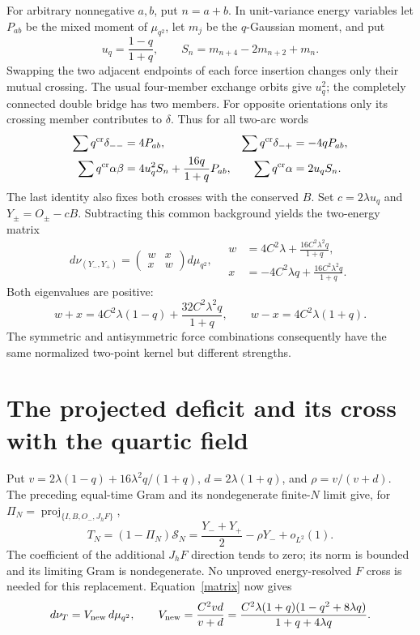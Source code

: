 \documentclass[11pt,a4paper]{article}
\begin{document}
For arbitrary nonnegative $a,b$, put $n=a+b$. In unit-variance
energy variables let $P_{ab}$ be the mixed moment of $\mu_{q^2}$,
let $m_j$ be the $q$-Gaussian moment, and put
\begin{equation}
 u_q=\frac{1-q}{1+q},\qquad S_n=m_{n+4}-2m_{n+2}+m_n.
\end{equation}
Swapping the two adjacent endpoints of each force insertion changes
only their mutual crossing. The usual four-member exchange orbits
give $u_q^2$; the completely connected double bridge has two
members. For opposite orientations only its crossing member
contributes to $\delta$. Thus for all two-arc words
\begin{align}
 \sum q^{\rm cr}\delta_{--}&=4P_{ab},&
 \sum q^{\rm cr}\delta_{-+}&=-4qP_{ab},\\
 \sum q^{\rm cr}\alpha\beta&=4u_q^2S_n+
                  \frac{16q}{1+q}P_{ab},&
 \sum q^{\rm cr}\alpha&=2u_qS_n.
\end{align}
The last identity also fixes both crosses with the conserved $B$.
Set $c=2\lambda u_q$ and $Y_\pm=O_\pm-cB$. Subtracting this common
background yields the two-energy matrix
\begin{equation}
 d\nu_{(Y_-,Y_+)}=
 \begin{pmatrix}w&x\\x&w\end{pmatrix}d\mu_{q^2},\quad
 \begin{aligned}
 w&=4C^2\lambda+\frac{16C^2\lambda^2q}{1+q},\\
 x&=-4C^2\lambda q+\frac{16C^2\lambda^2q}{1+q}.
 \end{aligned} \label{matrix}
\end{equation}
Both eigenvalues are positive:
\begin{equation}
 w+x=4C^2\lambda(1-q)+\frac{32C^2\lambda^2q}{1+q},\qquad
 w-x=4C^2\lambda(1+q).
\end{equation}
The symmetric and antisymmetric force combinations consequently
have the same normalized two-point kernel but different strengths.

\newpage
\section{The projected deficit and its cross with the quartic field}
Put $v=2\lambda(1-q)+16\lambda^2q/(1+q)$, $d=2\lambda(1+q)$,
and $\rho=v/(v+d)$. The preceding equal-time Gram and its
nondegenerate finite-$N$ limit give, for
$\Pi_N=\operatorname{proj}_{\{I,B,O_-,J_hF\}}$,
\begin{equation}
 T_N=(1-\Pi_N)\mathcal S_N
 =\frac{Y_-+Y_+}{2}-\rho Y_-+o_{L^2}(1). \label{T}
\end{equation}
The coefficient of the additional $J_hF$ direction tends to zero;
its norm is bounded and its limiting Gram is nondegenerate.
No unproved energy-resolved $F$ cross is needed for this replacement.
Equation~\eqref{matrix} now gives
\begin{equation}
 d\nu_T=V_{\rm new}\,d\mu_{q^2},\qquad
 V_{\rm new}=\frac{C^2vd}{v+d}
 =\frac{C^2\lambda(1+q)(1-q^2+8\lambda q)}{1+q+4\lambda q}.
\end{equation}
\end{document}
